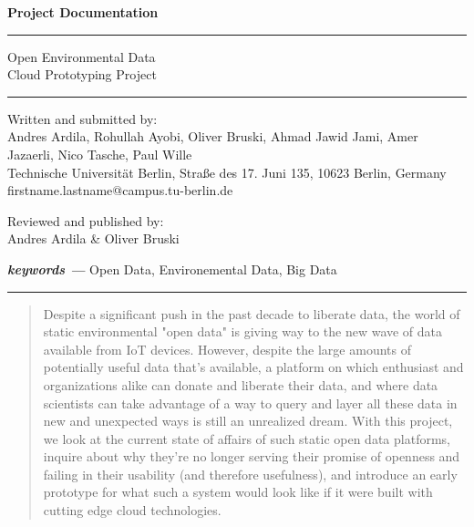 \documentclass{article}
\providecommand{\keywords}[1]{\textbf{\textit{keywords ---}} #1}
\begin{document}

\thispagestyle{empty}
\begin{flushleft}
\LARGE{\bfseries Project Documentation}\\
\end{flushleft}
\rule{\textwidth}{1pt}
\vspace{2pt}
\begin{flushleft}
\Huge{Open Environmental Data} \\
\huge{Cloud Prototyping Project} \\
\end{flushleft}
\rule{\textwidth}{1pt}


\newpage
\thispagestyle{empty}
\clearpage

\begin{center}
\Large{Written and submitted by:}\\
\vspace*{2mm}
\normalsize
Andres Ardila, Rohullah Ayobi, Oliver Bruski, Ahmad Jawid Jami, Amer Jazaerli, Nico Tasche, Paul Wille\\
\vspace*{7mm}
Technische Universit\"at Berlin, Stra\ss{}e des 17. Juni 135, 10623 Berlin, Germany\\
firstname.lastname@campus.tu-berlin.de
\end{center}

\vspace*{8mm}
\begin{center}
	\Large{Reviewed and published by:}\\
	\vspace*{2mm}
	\normalsize
	Andres Ardila \& Oliver Bruski
\end{center}

\keywords{Open Data, Environemental Data, Big Data}

\vspace*{1mm}
\rule{\textwidth}{1pt}
\vspace*{1mm}

\begin{abstract}
Despite a significant push in the past decade to liberate data, the world of
static environmental "open data" is giving way to the new wave of
data available from IoT devices. However, despite the large amounts of potentially
useful data that's available, a platform on which enthusiast and organizations
alike can donate and liberate their data, and where data scientists can take advantage
of a way to query and layer all these data in new and unexpected ways is still an
unrealized dream. With this project, we look at the current state of affairs of
such static open data platforms, inquire about why they're no longer serving their
promise of openness and failing in their usability (and therefore usefulness),
and introduce an early prototype for what such a system would look like if it
were built with cutting edge cloud technologies.
\end{abstract}
\newpage
\end{document}
